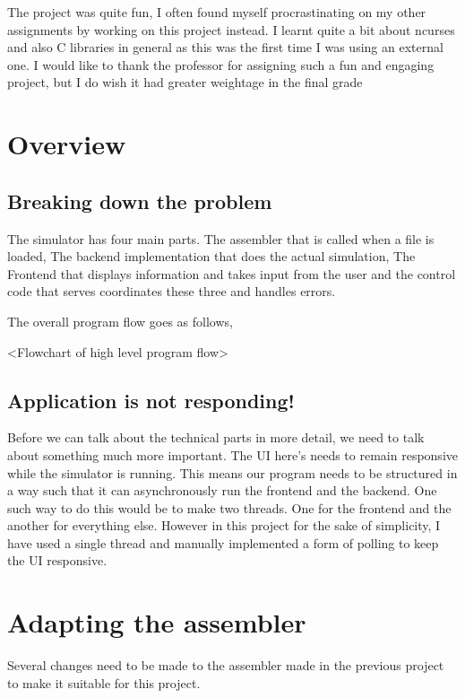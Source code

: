 \documentclass[12pt]{article}
\begin{document}
	The project was quite fun, I often found myself procrastinating on my other assignments by working on this project instead. I learnt quite a bit about ncurses and also C libraries in general as this was the first time I was using an external one. I would like to thank the professor for assigning such a fun and engaging project, but I do wish it had greater weightage in the final grade

	\section{Overview}

	\subsection{Breaking down the problem}

	The simulator has four main parts. The assembler that is called when a file is loaded, The backend implementation that does the actual simulation, The Frontend that displays information and takes input from the user and the control code that serves coordinates these three and handles errors.

	The overall program flow goes as follows,

	<Flowchart of high level program flow>

	\subsection{Application is not responding!}

	Before we can talk about the technical parts in more detail, we need to talk about something much more important. The UI here's needs to remain responsive while the simulator is running. This means our program needs to be structured in a way such that it can asynchronously run the frontend and the backend. One such way to do this would be to make two threads. One for the frontend and the another for everything else. However in this project for the sake of simplicity, I have used a single thread and manually implemented a form of polling to keep the UI responsive.

	\section{Adapting the assembler}

	Several changes need to be made to the assembler made in the previous project to make it suitable for this project.
\end{document}
